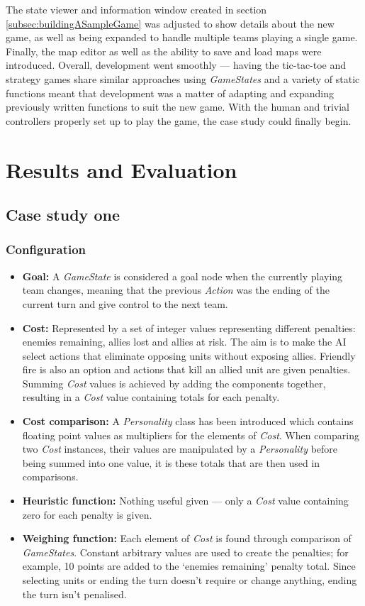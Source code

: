 \documentclass[11pt, a4paper]{report}
\begin{document}
The state viewer and information window created in section \ref{subsec:buildingASampleGame} was adjusted to show details about the new game, as well as being expanded to handle multiple teams playing a single game. Finally, the map editor as well as the ability to save and load maps were introduced. Overall, development went smoothly --- having the tic-tac-toe and strategy games share similar approaches using \emph{GameStates} and a variety of static functions meant that development was a matter of adapting and expanding previously written functions to suit the new game. With the human and trivial controllers properly set up to play the game, the case study could finally begin.

\section{Results and Evaluation}
\label{sec:resultsAndEvaluation}

\subsection{Case study one}
\label{subsec:caseStudyOne}

\subsubsection{Configuration}

\begin{itemize}
  \item \textbf{Goal:} A \emph{GameState} is considered a goal node when the currently playing team changes, meaning that the previous \emph{Action} was the ending of the current turn and give control to the next team.
  \item \textbf{Cost:} Represented by a set of integer values representing different penalties: enemies remaining, allies lost and allies at risk. The aim is to make the AI select actions that eliminate opposing units without exposing allies. Friendly fire is also an option and actions that kill an allied unit are given penalties. Summing \emph{Cost} values is achieved by adding the components together, resulting in a \emph{Cost} value containing totals for each penalty.
  \item \textbf{Cost comparison:} A \emph{Personality} class has been introduced which contains floating point values as multipliers for the elements of \emph{Cost}. When comparing two \emph{Cost} instances, their values are manipulated by a \emph{Personality} before being summed into one value, it is these totals that are then used in comparisons.
  \item \textbf{Heuristic function:} Nothing useful given --- only a \emph{Cost} value containing zero for each penalty is given.
  \item \textbf{Weighing function:} Each element of \emph{Cost} is found through comparison of \emph{GameStates}. Constant arbitrary values are used to create the penalties; for example, 10 points are added to the `enemies remaining' penalty total. Since selecting units or ending the turn doesn't require or change anything, ending the turn isn't penalised. 
\end{itemize}
\end{document}

